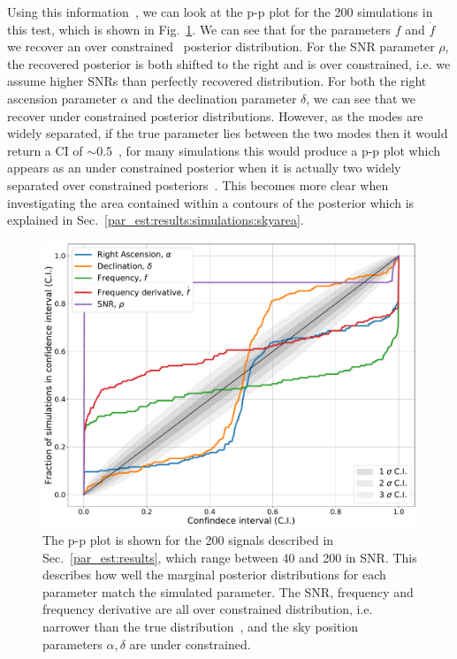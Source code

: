 Using this information~, we
can look at the p-p plot for the 200 simulations in this test, which is shown
in Fig.~\ref{par_est:results:ppplot}.  We can see that for the parameters $f$
and $\dot{f}$ we recover an over constrained~ posterior
distribution.  For the \gls{SNR} parameter $\rho$, the recovered posterior is
both shifted to the right and is over constrained, i.e. we assume higher
\glspl{SNR} than perfectly recovered distribution.  For both the right
ascension parameter $\alpha$ and the declination parameter $\delta$, we can see
that we recover under constrained posterior distributions.  However, as the
modes are widely separated, if the true parameter lies between the two modes
then it would return a \gls{CI} of $\sim 0.5$~, for many simulations this
would produce a p-p plot which appears as an under constrained posterior when
it is actually two widely separated over constrained posteriors~. This becomes more clear when
investigating the area contained within a contours of the posterior which is
explained in Sec.~\ref{par_est:results:simulations:skyarea}.
%
\begin{figure}[ht]
    \centering
    \includegraphics[width=\linewidth]{C5_parameter/ppplot.pdf}
    \caption[p-p plot for the CW simulations]{The p-p plot is shown for the 200
signals described in Sec.~\ref{par_est:results}, which range between 40 and 200
in \gls{SNR}. This describes how well the marginal posterior distributions for
each parameter match the simulated parameter. The \gls{SNR}, frequency and
frequency derivative are all over constrained distribution, i.e. narrower than
the true distribution~, and the sky position parameters
$\alpha,\delta$ are under constrained.} \label{par_est:results:ppplot}
\end{figure}

